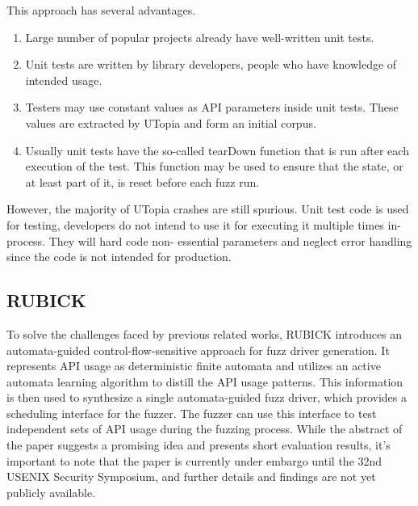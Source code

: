 \documentclass[a4paper,11pt,oneside]{report}
\begin{document}
This approach has several advantages. 
\begin{enumerate}
  \item Large number of popular projects already have 
  well-written unit tests.
  \item Unit tests are written by library developers, 
  people who have knowledge of intended usage.
  \item Testers may use constant values as API parameters 
  inside unit tests. These values are extracted by UTopia
  and form an initial corpus.
  \item Usually unit tests have the so-called tearDown function
  that is run after each execution of the test. This function may 
  be used to ensure that the state, or at least part of it, is reset
  before each fuzz run.
\end{enumerate}

However, the majority of UTopia crashes are still spurious. Unit test
code is used for testing, developers do not intend to use it for 
executing it multiple times in-process. They will hard code non-
essential parameters and neglect error handling since the code is not
intended for production. 


\subsection{RUBICK}


To solve the challenges faced by previous related works, RUBICK
introduces an automata-guided control-flow-sensitive approach for
fuzz driver generation. It represents API usage as deterministic 
finite automata and utilizes an active automata learning algorithm 
to distill the API usage patterns. This information is then 
used to synthesize a single automata-guided fuzz driver, 
which provides a scheduling interface for the fuzzer. 
The fuzzer can use this interface to test independent 
sets of API usage during the fuzzing process. While the 
abstract of the paper suggests a promising idea and 
presents short evaluation results, it's important to note 
that the paper is currently under embargo until the 
32nd USENIX Security Symposium, and further details and 
findings are not yet publicly available.





\end{document}
